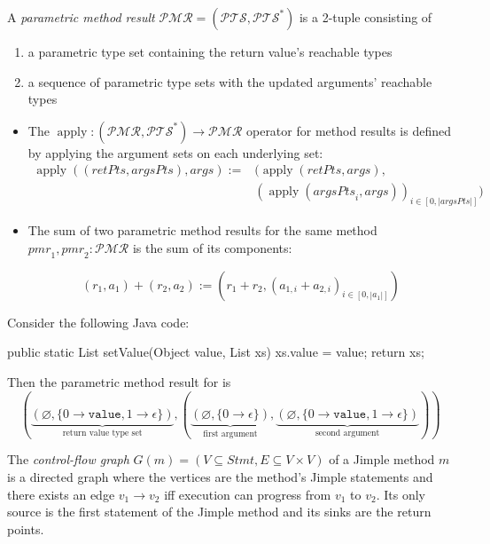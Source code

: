 \begin{definition}
\label{def:pmr}
A \emph{parametric method result} $\mathcal{PMR} = (\mathcal{PTS}, \mathcal{PTS}^*)$ is a 2-tuple consisting of 
\begin{enumerate}
    \item a parametric type set containing the return value's reachable types
    \item a sequence of parametric type sets with the updated arguments' reachable types
\end{enumerate}

\begin{itemize}
    \item The $\operatorname{apply} : (\mathcal{PMR}, \mathcal{PTS}^*) \to \mathcal{PMR}$ operator for method results is defined by applying the argument sets on each underlying set: \begin{align*}
\operatorname{apply}((\mathit{retPts}, \mathit{argsPts}), args) :=& (\operatorname{apply}(\mathit{retPts}, args), \\
    & (\operatorname{apply}(\mathit{argsPts}_i, args))_{i \in [0,|\mathit{argsPts}|]})
    \end{align*}
                \item The sum of two parametric method results for the same method $\mathit{pmr}_1, \mathit{pmr}_2 : \mathcal{PMR}$ is the sum of its components:
    
        \[ (r_1, a_1) + (r_2, a_2) := (r_1 + r_2, (a_{1,i} + a_{2,i})_{i \in [0, |a_1|]}) \]
    

\end{itemize}
\end{definition}
\begin{example}
\label{ex:pmr}
Consider the following Java code:
\begin{javacode}
public static List setValue(Object value, List xs) {
    xs.value = value;
    return xs;
}
\end{javacode}
Then the parametric method result for  is \[( \underbrace{(\varnothing, \{ 0 \to \mathtt{value}, 1 \to \epsilon\})}_\text{return value type set} , (\underbrace{(\varnothing, \{0 \to \epsilon\})}_\text{first argument}, \underbrace{(\varnothing, \{ 0 \to \mathtt{value}, 1 \to \epsilon\})}_\text{second argument}))\]
\end{example}
\newpage
\begin{definition}
The \emph{control-flow graph} $G(m) = (V \subseteq \mathit{Stmt},E \subseteq V \times V)$ of a Jimple method $m$ is a directed graph where the vertices are the method's Jimple statements and there exists an edge $v_1 \to v_2$ iff execution can progress from $v_1$ to $v_2$. Its only source is the first statement of the Jimple method and its sinks are the return points.
\end{definition}
